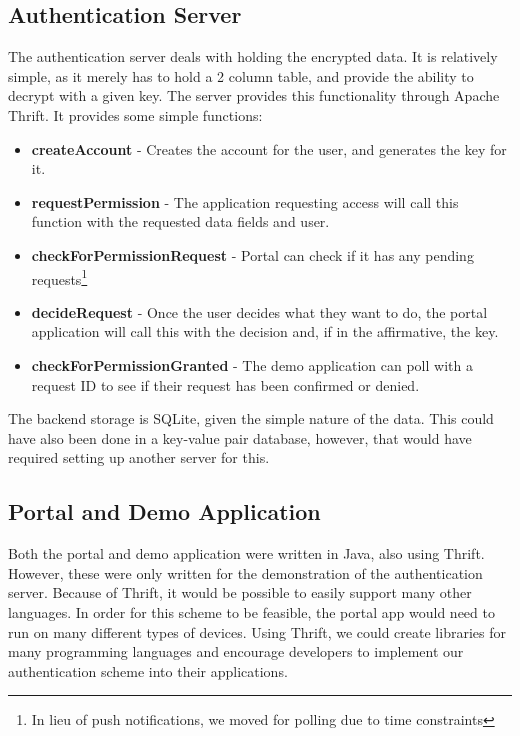 \documentclass[letterpaper,twocolumn,10pt]{article}
\begin{document}
\subsection{Authentication Server}
    The authentication server deals with holding the encrypted data. It is relatively simple, as it merely has to hold a 2 column table, and provide the ability to decrypt with a given key. The server provides this functionality through Apache Thrift\cite{thrift}. It provides some simple functions:
    \begin{itemize}
        \item \textbf{createAccount} - Creates the account for the user, and generates the key for it.
        \item \textbf{requestPermission} - The application requesting access will call this function with the requested data fields and user.
        \item \textbf{checkForPermissionRequest} - Portal can check if it has any pending requests\footnote{In lieu of push notifications, we moved for polling due to time constraints} 
        \item \textbf{decideRequest} - Once the user decides what they want to do, the portal application will call this with the decision and, if in the affirmative, the key.
        \item \textbf{checkForPermissionGranted} - The demo application can poll with a request ID to see if their request has been confirmed or denied.
    \end{itemize}

The backend storage is SQLite, given the simple nature of the data. This could have also been done in a key-value pair database, however, that would have required setting up another server for this.

\subsection{Portal and Demo Application}
Both the portal and demo application were written in Java, also using Thrift. However, these were only written for the demonstration of the authentication server. Because of Thrift, it would be possible to easily support many other languages. In order for this scheme to be feasible, the portal app would need to run on many different types of devices. Using Thrift, we could create libraries for many programming languages and encourage developers to implement our authentication scheme into their applications.
\end{document}
